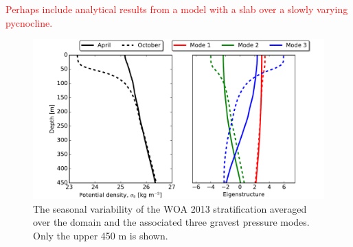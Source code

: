 \documentclass[grl]{agutex2015}
\begin{document}
\begin{article}
\textcolor{red}{Perhaps include analytical results from a model with a slab over a slowly varying
pycnocline.}

\begin{figure}[ht]
   \begin{center}
     \includegraphics[width=1.\textwidth]{figs/fig_s3.pdf}
  \caption{The seasonal variability of the WOA 2013 stratification averaged  over
  the domain and the associated three gravest pressure modes. Only the upper 450 m is shown.}
  \label{figS3}
  \end{center}
\end{figure}


%
%
%
%
%
%



\end{article}
\end{document}
